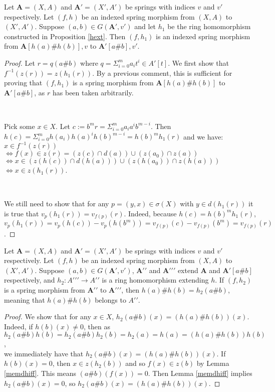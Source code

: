 \begin{proposition}
  Let $\boldsymbol{A}=(X,A)$ and $\boldsymbol{A'}=(X',A')$ be springs with indices $v$ and $v'$
  respectively. Let $(f,h)$ be an indexed spring morphism from $(X,A)$ to $(X',A')$. Suppose
  $(a,b)\in{G}(\boldsymbol{A'},v')$ and let $h_1$ be the ring homomorphism constructed in
  Proposition \ref{hext}. Then $(f,h_1)$ is an indexed spring morphism from
  $\boldsymbol{A}[h(a)\#h(b)],v$ to $\boldsymbol{A'}[a\#b],v'$.
\end{proposition}
\begin{proof}
  Let $r=q(a\#b)$ where $q=\Sigma_{i=0}^{m}{a_i}t^i\in{A'}[t]$. We first show that
  $f^{-1}(z(r))=z(h_1(r))$. By a previous comment, this is sufficient for proving that $(f,h_1)$ is
  a spring morphism from $\boldsymbol{A}[h(a)\#h(b)]$ to $\boldsymbol{A'}[a\#b]$, as $r$ has been
  taken arbitrarily.

  \

  Pick some $x\in{X}$. Let $c:=b^m{r}=\Sigma_{i=0}^m{a_i}a^i{b^{m-i}}$. Then
  $h(c)=\Sigma_{i=0}^m{h(a_i)}{h(a)^i}h(b)^{m-i}=h(b)^m{h_1(r)}$ and we have:
  \\
  $x\in{f^{-1}}(z(r))$
  \\
  $\Leftrightarrow{f(x)\in{z(r)}}=(z(c)\cap{d}(a))\cup(z(a_0)\cap{z}(a))$
  \\
  $\Leftrightarrow{x}\in(z(h(c))\cap{d}(h(a)))\cup(z(h(a_0))\cap{z}(h(a)))$
  \\
  $\Leftrightarrow{x}\in{z(h_1(r))}$.

  \

  We still need to show that for any $p=(y,x)\in\sigma(X)$ with $y\in{d}(h_1(r))$ it is true that
  $v_p(h_1(r))=v_{f(p)}(r)$. Indeed, because $h(c)=h(b)^m{h_1}(r)$,
  $v_p(h_1(r))=v_p(h(c))-v_p(h(b^m))=v_{f(p)}(c)-v_{f(p)}(b^m)=v_{f(p)}(r)$.
\end{proof}


\begin{proposition}
  Let $\boldsymbol{A}=(X,A)$ and $\boldsymbol{A'}=(X',A')$ be springs with indices $v$ and $v'$
  respectively. Let $(f,h)$ be an indexed spring morphism from $(X,A)$ to $(X',A')$. Suppose
  $(a,b)\in{G}(\boldsymbol{A'},v')$, $\boldsymbol{{A'}{'}}$ and $\boldsymbol{{A'}{'}{'}}$ extend
  $\boldsymbol{A}$ and $\boldsymbol{A'}[a\#b]$ respectively, and $h_2:{A'{'}{'}}\rightarrow{A'{'}}$
  is a ring homomorphism extending $h$. If $(f,h_2)$ is a spring morphism from $\boldsymbol{A'{'}}$
  to $\boldsymbol{A'{'}{'}}$, then $h(a)\#h(b)=h_2(a\#b)$, meaning that $h(a)\#h(b)$ belongs to
  ${A'}{'}$.
\end{proposition}
\begin{proof}
  We show that for any $x\in{X}$, $h_2(a\#b)(x)=(h(a)\#h(b))(x)$. Indeed, if $h(b)(x)\neq{0}$, then
  as
  \\
  $h_2(a\#b)h(b)=h_2(a\#b)h_2(b)=h_2(a)=h(a)=(h(a)\#h(b))h(b)$,
  \\
  we immediately have that $h_2(a\#b)(x)=(h(a)\#h(b))(x)$. If $h(b)(x)=0$, then $x\in{z}(h_2(b))$
  and so $f(x)\in{z}(b)$ by Lemma \ref{memdhiff}. This means $(a\#b)(f(x))=0$. Then Lemma
  \ref{memdhiff} implies $h_2(a\#b)(x)=0$, so $h_2(a\#b)(x)=(h(a)\#h(b))(x)$.
\end{proof}
